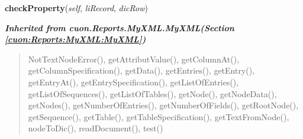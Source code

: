 \hspace{.8\funcindent}\begin{boxedminipage}{\funcwidth}

    \raggedright \textbf{checkProperty}(\textit{self}, \textit{liRecord}, \textit{dicRow})

\setlength{\parskip}{2ex}
\setlength{\parskip}{1ex}
    \end{boxedminipage}


\large{\textbf{\textit{Inherited from cuon.Reports.MyXML.MyXML\textit{(Section \ref{cuon:Reports:MyXML:MyXML})}}}}

\begin{quote}
NotTextNodeError(), getAttributValue(), getColumnAt(), getColumnSpecification(), getData(), getEntries(), getEntry(), getEntryAt(), getEntrySpecification(), getListOfEntries(), getListOfSequences(), getListOfTables(), getNode(), getNodeData(), getNodes(), getNumberOfEntries(), getNumberOfFields(), getRootNode(), getSequence(), getTable(), getTableSpecification(), getTextFromNode(), nodeToDic(), readDocument(), test()
\end{quote}
